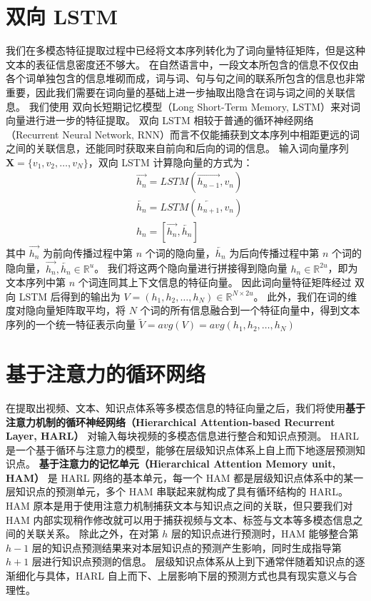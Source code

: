 \section{双向 LSTM}
    我们在多模态特征提取过程中已经将文本序列转化为了词向量特征矩阵，但是这种文本的表征信息密度还不够大。
    在自然语言中，一段文本所包含的信息不仅仅由各个词单独包含的信息堆砌而成，词与词、句与句之间的联系所包含的信息也非常重要，因此我们需要在词向量的基础上进一步抽取出隐含在词与词之间的关联信息。
    我们使用 双向长短期记忆模型（Long Short-Term Memory, LSTM）\cite{Hochreiter1997LongSM}来对词向量进行进一步的特征提取。
    双向 LSTM 相较于普通的循环神经网络（Recurrent Neural Network, RNN）而言不仅能捕获到文本序列中相距更远的词之间的关联信息，还能同时获取来自前向和后向的词的信息。
    输入词向量序列 $\boldsymbol{X} = \{v_1, v_2, \dots, v_N\}$，双向 LSTM 计算隐向量的方式为：
    \begin{equation}
        \begin{aligned}
            &\overrightarrow{h_{n}} = LSTM\left(\overrightarrow{h_{n - 1}}, v_n\right) \\
            &\overleftarrow{h_{n}} = LSTM\left(\overleftarrow{h_{n + 1}}, v_n\right) \\
            &h_n = \left[\overrightarrow{h_n}, \overleftarrow{h_n}\right]
        \end{aligned}
    \end{equation}
    其中 $\overrightarrow{h_{n}}$ 为前向传播过程中第 $n$ 个词的隐向量，$\overleftarrow{h_{n}}$ 为后向传播过程中第 $n$ 个词的隐向量，$\overrightarrow{h_{n}}, \overleftarrow{h_{n}} \in \mathbb{R}^{u}$。
    我们将这两个隐向量进行拼接得到隐向量 $h_n \in \mathbb{R}^{2u}$，即为文本序列中第 $n$ 个词连同其上下文信息的特征向量。
    因此词向量特征矩阵经过 双向 LSTM 后得到的输出为 $V = \left(h_1, h_2, \dots, h_N\right) \in \mathbb{R}^{N \times 2u}$。
    此外，我们在词的维度对隐向量矩阵取平均，将 $N$ 个词的所有信息融合到一个特征向量中，得到文本序列的一个统一特征表示向量 $\tilde{V} = avg\left(V\right) = avg\left(h_1, h_2, \dots, h_N\right)$


\section{基于注意力的循环网络}
    在提取出视频、文本、知识点体系等多模态信息的特征向量之后，我们将使用\textbf{基于注意力机制的循环神经网络（Hierarchical Attention-based Recurrent Layer, HARL）}\cite{Huang2019HierarchicalMT} 对输入每块视频的多模态信息进行整合和知识点预测。
    HARL 是一个基于循环与注意力的模型，能够在层级知识点体系上自上而下地逐层预测知识点。
    \textbf{基于注意力的记忆单元（Hierarchical Attention Memory unit, HAM）} 是 HARL 网络的基本单元，每一个 HAM 都是层级知识点体系中的某一层知识点的预测单元，多个 HAM 串联起来就构成了具有循环结构的 HARL。
    HAM 原本是用于使用注意力机制捕获文本与知识点之间的关联，但只要我们对 HAM 内部实现稍作修改就可以用于捕获视频与文本、标签与文本等多模态信息之间的关联关系。
    除此之外，在对第 $h$ 层的知识点进行预测时，HAM 能够整合第 $h - 1$ 层的知识点预测结果来对本层知识点的预测产生影响，同时生成指导第 $h + 1$ 层进行知识点预测的信息。
    层级知识点体系从上到下通常伴随着知识点的逐渐细化与具体，HARL 自上而下、上层影响下层的预测方式也具有现实意义与合理性。

